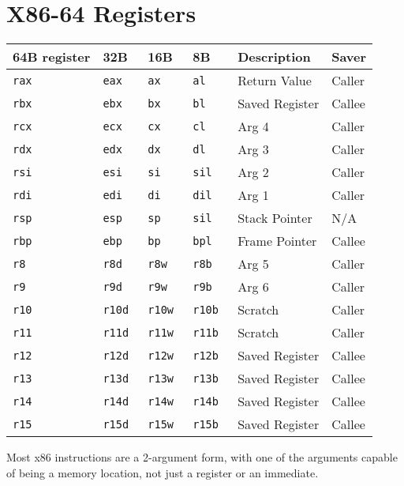 \section*{X86-64 Registers}

\begin{tabular} {l | l | l | l | l | l} \hline
  64B register & 32B & 16B & 8B & Description & Saver \\ \hline
  \tt{rax} & \tt{eax} & \tt{ax} & \tt{al} & Return Value & Caller \\
  \tt{rbx} & \tt{ebx} & \tt{bx} & \tt{bl} & Saved Register & Callee \\
  \tt{rcx} & \tt{ecx} & \tt{cx} & \tt{cl} & Arg 4 & Caller \\
  \tt{rdx} & \tt{edx} & \tt{dx} & \tt{dl} & Arg 3 & Caller \\
  \tt{rsi} & \tt{esi} & \tt{si} & \tt{sil} & Arg 2 & Caller \\
  \tt{rdi} & \tt{edi} & \tt{di} & \tt{dil} & Arg 1 & Caller \\
  \tt{rsp} & \tt{esp} & \tt{sp} & \tt{sil} & Stack Pointer & N/A \\
  \tt{rbp} & \tt{ebp} & \tt{bp} & \tt{bpl} & Frame Pointer & Callee \\
  \tt{r8} & \tt{r8d} & \tt{r8w} & \tt{r8b} & Arg 5 & Caller \\
  \tt{r9} & \tt{r9d} & \tt{r9w} & \tt{r9b} & Arg 6  & Caller \\
  \tt{r10} & \tt{r10d} & \tt{r10w} & \tt{r10b} & Scratch & Caller \\
  \tt{r11} & \tt{r11d} & \tt{r11w} & \tt{r11b} & Scratch & Caller \\
  \tt{r12} & \tt{r12d} & \tt{r12w} & \tt{r12b} & Saved Register & Callee \\
  \tt{r13} & \tt{r13d} & \tt{r13w} & \tt{r13b} & Saved Register & Callee \\
  \tt{r14} & \tt{r14d} & \tt{r14w} & \tt{r14b} & Saved Register & Callee \\
  \tt{r15} & \tt{r15d} & \tt{r15w} & \tt{r15b} & Saved Register & Callee \\
\end{tabular}

\vspace{0.2in} Most x86 instructions are a 2-argument form, with one
of the arguments capable of being a memory location, not just a
register or an immediate.

\vspace{0.2in}

